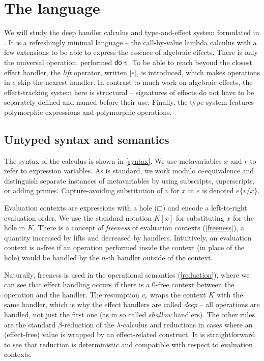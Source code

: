 \documentclass[a4paper, 11pt,titlepage, openright, twoside]{report}
\newcommand{\keyword}[1]{\textsf{\textup{#1}}}
\newcommand{\Do}{\keyword{do}\;}
\newcommand{\Lift}[1]{\boldsymbol{[}#1\boldsymbol{]}}
\newcommand{\subst}[2]{\{#1/#2\}}
\newcommand{\Free}{\textrm{-}\mathrm{free}}
\newcommand{\+}{\enspace}
\begin{document}
\chapter{The language}\label{chap:language}
We will study the deep handler calculus and type-and-effect system formulated
in \cite{fscd19}.
It is a refreshingly minimal language – the call-by-value lambda calculus with a few extensions
to be able to express the essence of algebraic effects.
There is only the universal operation, performed $\Do v$.
To be able to reach beyond the closest effect handler,
the \textit{lift} operator, written $\Lift{e}$, is introduced,
which makes operations in $e$ skip the nearest handler.
In contrast to much work on algebraic effects, the effect-tracking system here is structural –
signatures of effects do not have to be separately defined and named before their use.
Finally, the type system features polymorphic expressions and polymorphic operations.

\section{Untyped syntax and semantics}

The syntax of the calculus is shown in \cref{syntax}.
We use metavariables $x$ and $r$ to refer to expression variables.
As is standard, we work modulo $α$-equivalence and distinguish separate instances
of metavariables by using subscripts, superscripts, or adding primes.
Capture-avoiding substitution of $v$ for $x$ in $e$ is denoted $e\subst{v}{x}$.

Evaluation contexts are expressions with a hole ($□$) and
encode a left-to-right evaluation order.
We use the standard notation $K[x]$ for substituting $x$ for the hole in $K$.
There is a concept of {\em freeness} of evaluation contexts (\cref{freeness}),
a quantity increased by lifts and decreased by handlers.
Intuitively, an evaluation context is $n\Free$
if an operation performed inside the context (in place of the hole) %
would be handled by the $n$-th handler outside of the context.

Naturally, freeness is used in the operational semantics (\cref{reduction}),
where we can see that effect handling occurs if there
is a $0\Free$ context between the operation and the handler.
The resumption $v_c$ wraps the context $K$
with the same handler, which is why the effect handlers are called {\em deep}
– all operations are handled, not just the first one (as in so called {\em shallow} handlers).
The other rules are the standard $β$-reduction of the $λ$-calculus
and reductions in cases where an (effect-free) value is wrapped by an effect-related construct.
It is straightforward to see that reduction is deterministic
and compatible with respect to evaluation contexts.
\end{document}
